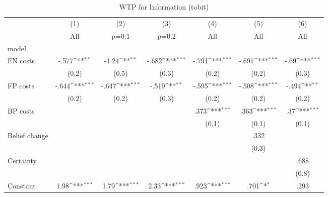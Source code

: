 \begin{table}[htbp]\centering
\def\sym#1{\ifmmode^{#1}\else\(^{#1}\)\fi}
\caption{WTP for Information (tobit)}
\begin{tabular}{l*{6}{c}}
\hline\hline
                &\multicolumn{1}{c}{(1)}&\multicolumn{1}{c}{(2)}&\multicolumn{1}{c}{(3)}&\multicolumn{1}{c}{(4)}&\multicolumn{1}{c}{(5)}&\multicolumn{1}{c}{(6)}\\
                &\multicolumn{1}{c}{All}&\multicolumn{1}{c}{p=0.1}&\multicolumn{1}{c}{p=0.2}&\multicolumn{1}{c}{All}&\multicolumn{1}{c}{All}&\multicolumn{1}{c}{All}\\
\hline
model           &                  &                  &                  &                  &                  &                  \\
FN costs        &    -.577\sym{**} &    -1.24\sym{**} &    -.682\sym{***}&    -.791\sym{***}&    -.691\sym{***}&     -.69\sym{***}\\
                &    (0.2)         &    (0.5)         &    (0.3)         &    (0.2)         &    (0.2)         &    (0.3)         \\
FP costs        &    -.644\sym{***}&    -.647\sym{***}&    -.519\sym{**} &    -.595\sym{***}&    -.508\sym{***}&    -.494\sym{**} \\
                &    (0.2)         &    (0.2)         &    (0.3)         &    (0.2)         &    (0.2)         &    (0.2)         \\
BP costs        &                  &                  &                  &     .373\sym{***}&     .363\sym{***}&      .37\sym{***}\\
                &                  &                  &                  &    (0.1)         &    (0.1)         &    (0.1)         \\
Belief change   &                  &                  &                  &                  &     .332         &                  \\
                &                  &                  &                  &                  &    (0.3)         &                  \\
Certainty       &                  &                  &                  &                  &                  &     .688         \\
                &                  &                  &                  &                  &                  &    (0.8)         \\
Constant        &     1.98\sym{***}&     1.79\sym{***}&     2.33\sym{***}&     .923\sym{***}&     .701\sym{*}  &     .293         \\

\end{tabular}
\end{table}
